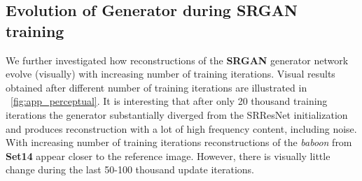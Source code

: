 \documentclass[10pt,twocolumn,letterpaper]{article}
\begin{document}
\subsection{Evolution of Generator during SRGAN training}
\label{app:evolution}
We further investigated how reconstructions of the \textbf{SRGAN} generator network evolve (visually) with increasing number of training iterations. Visual results obtained after different number of training iterations are illustrated in \figurename~\ref{fig:app_perceptual}. It is interesting that after only 20 thousand training iterations the generator substantially diverged from the SRResNet initialization and produces reconstruction with a lot of high frequency content, including noise. With increasing number of training iterations reconstructions of the \textit{baboon} from \textbf{Set14} appear closer to the reference image. However, there is visually little change during the last 50-100 thousand update iterations.
\end{document}
